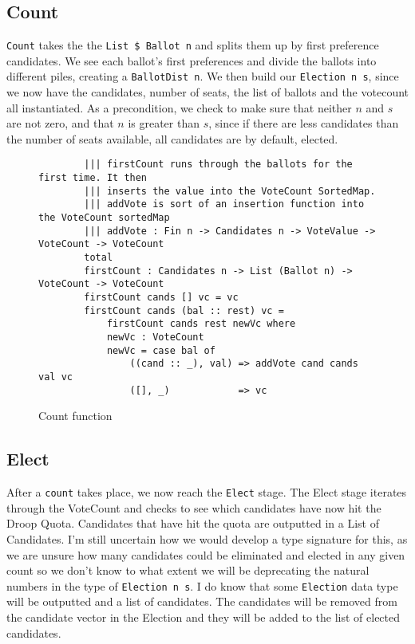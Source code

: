 \subsection{Count}

\texttt{Count} takes the the \texttt{List \$ Ballot n} and splits them up by
first preference candidates. We see each ballot's first preferences and divide
the ballots into different piles, creating a \texttt{BallotDist n}. We then
build our \texttt{Election n s}, since we now have the candidates, number of
seats, the list of ballots and the votecount all instantiated.  As a
precondition, we check to make sure that neither $n$ and $s$ are not zero, and
that $n$ is greater than $s$, since if there are less candidates than the number
of seats available, all candidates are by default, elected. 

\begin{figure}[ht!!!!!!!]
    \caption{Count function}
    \label{firstcount}
    \begin{lstlisting}
        ||| firstCount runs through the ballots for the first time. It then
        ||| inserts the value into the VoteCount SortedMap. 
        ||| addVote is sort of an insertion function into the VoteCount sortedMap
        ||| addVote : Fin n -> Candidates n -> VoteValue -> VoteCount -> VoteCount
        total
        firstCount : Candidates n -> List (Ballot n) -> VoteCount -> VoteCount
        firstCount cands [] vc = vc
        firstCount cands (bal :: rest) vc = 
            firstCount cands rest newVc where
            newVc : VoteCount
            newVc = case bal of
                ((cand :: _), val) => addVote cand cands val vc
                ([], _)            => vc
    \end{lstlisting}
\end{figure}


\subsection{Elect}

After a \texttt{count} takes place, we now reach the \texttt{Elect} stage. The
Elect stage iterates through the VoteCount and checks to see which candidates
have now hit the Droop Quota. Candidates that have hit the quota are outputted
in a List of Candidates. I'm still uncertain how we would develop a type
signature for this, as we are unsure how many candidates could be eliminated and
elected in any given count so we don't know to what extent we will be
deprecating the natural numbers in the type of \texttt{Election n s}. I do know
that some \texttt{Election} data type will be outputted and a list of
candidates. The candidates will be removed from the candidate vector in the
Election and they will be added to the list of elected candidates. 

